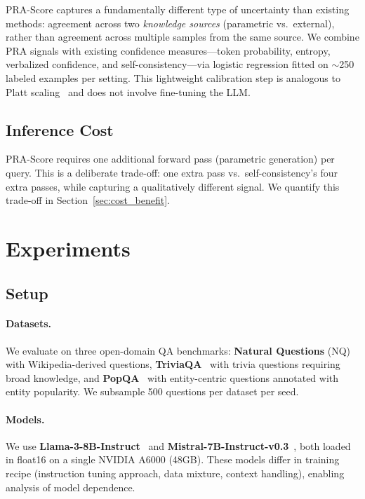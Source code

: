 \documentclass{article}
\begin{document}
PRA-Score captures a fundamentally different type of uncertainty than existing methods: agreement across two \emph{knowledge sources} (parametric vs.\ external), rather than agreement across multiple samples from the same source. We combine PRA signals with existing confidence measures---token probability, entropy, verbalized confidence, and self-consistency---via logistic regression fitted on ${\sim}$250 labeled examples per setting. This lightweight calibration step is analogous to Platt scaling~\citep{platt1999probabilistic} and does not involve fine-tuning the LLM.

\subsection{Inference Cost}

PRA-Score requires one additional forward pass (parametric generation) per query. This is a deliberate trade-off: one extra pass vs.\ self-consistency's four extra passes, while capturing a qualitatively different signal. We quantify this trade-off in Section~\ref{sec:cost_benefit}.

\section{Experiments}
\label{sec:experiments}

\subsection{Setup}
\label{sec:setup}

\paragraph{Datasets.} We evaluate on three open-domain QA benchmarks: \textbf{Natural Questions} (NQ)~\citep{kwiatkowski2019nq} with Wikipedia-derived questions, \textbf{TriviaQA}~\citep{joshi2017triviaqa} with trivia questions requiring broad knowledge, and \textbf{PopQA}~\citep{mallen2023when} with entity-centric questions annotated with entity popularity. We subsample 500 questions per dataset per seed.

\paragraph{Models.} We use \textbf{Llama-3-8B-Instruct}~\citep{meta2024llama3} and \textbf{Mistral-7B-Instruct-v0.3}~\citep{jiang2023mistral7b}, both loaded in float16 on a single NVIDIA A6000 (48GB). These models differ in training recipe (instruction tuning approach, data mixture, context handling), enabling analysis of model dependence.
\end{document}
